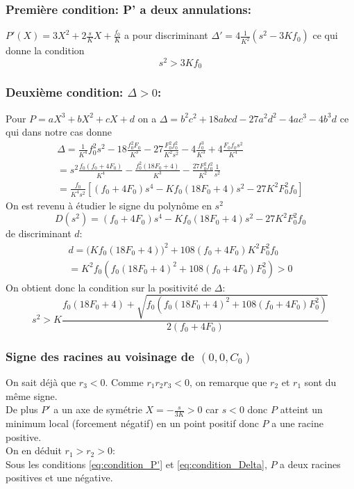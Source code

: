 \documentclass[11pt]{article}
\begin{document}
\subsubsection{Première condition: P' a deux annulations:}
$P'(X)= 3X^2+ 2\frac{s}{K}X+ \frac{f_0}{K}$ a pour discriminant $\Delta'=4\frac{1}{K^2}(s^2-3Kf_0)$ ce qui donne la condition \begin{equation} \label{eq:condition_P'}
	\boxed{s^2 >3K f_0
	}
\end{equation}
\subsubsection{Deuxième condition: $\Delta>0$:}
Pour $P=aX^3 +bX^2 + cX + d$ on a $\Delta= b^2c^2 +18abcd-27a^2d^2 -4ac^3 -4b^3d$ ce qui dans notre cas donne
\begin{align*}
	\Delta=\frac{1}{K^4}f_0^2s^2 -18 \frac{f_0^2F_0}{K^3}-27 \frac{F_0^2 f_0^2}{K^2s^2} - 4 \frac{f_0^3}{K^3}+4 \frac{F_0f_0s^2}{K^4} \\ = s^2 \frac{f_0(f_0+4F_0)}{K^4}- \frac{f_0^2(18F_0+4)}{K^3} -\frac{27F_0^2f_0^2}{K^2} \frac{1}{s^2}\\ 
=	\frac{f_0}{K^4s^2}[(f_0+4F_0)s^4-Kf_0(18F_0+4) s^2 - 27 K^2F_0^2f_0] \end{align*}
On est revenu à étudier le signe du polynôme en $s^2$ \begin{equation}
	D(s^2)=(f_0+4F_0)s^4-Kf_0(18F_0+4)s^2 - 27 K^2F_0^2f_0
\end{equation} 
de discriminant $d$:
\begin{align*}
	d=\Big(Kf_0(18F_0+4) \Big)^2 +108(f_0+4F_0)K^2F_0^2f_0 \\ 
	= K^2f_0(f_0(18F_0+4)^2+108(f_0+4F_0)F_0^2) >0
\end{align*}
On obtient donc la condition sur la positivité de $\Delta$: 
\begin{equation}\boxed{
	s^2> K\frac{f_0(18F_0+4)+\sqrt{f_0(f_0(18F_0+4)^2+108(f_0+4F_0)F_0^2)}}{2(f_0+4F_0)}
	}\label{eq:condition_Delta}
\end{equation}
\subsubsection{Signe des racines au voisinage de $(0,0,C_0)$}
On sait déjà que $r_3<0$. Comme $r_1r_2r_3<0$, on remarque que $r_2$ et $r_1$ sont du même signe.\\
De plus $P'$ a un axe de symétrie $X=-\frac{s}{3K}>0$ car $s<0$ donc $P$ atteint un minimum local (forcement négatif) en un point positif donc $P$ a une racine positive.\\
On en déduit $r_1>r_2>0$: \\ 
Sous les conditions \eqref{eq:condition_P'} et \eqref{eq:condition_Delta}, $P$ a deux racines positives et une négative.
\end{document}
